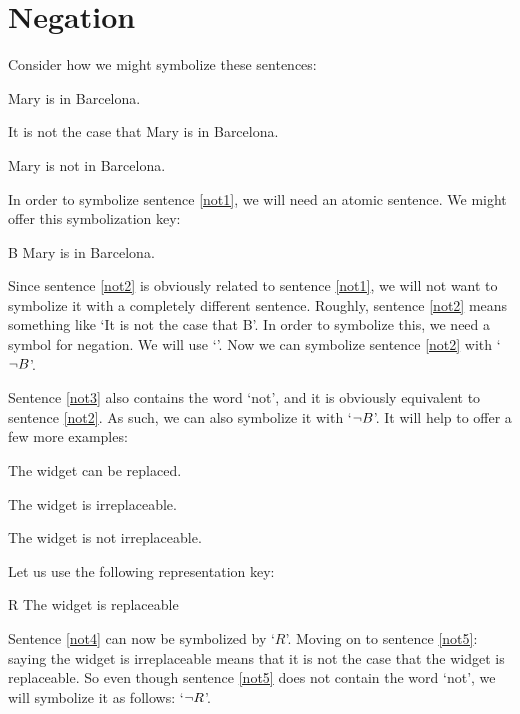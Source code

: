         
\section{Negation}

Consider how we might symbolize these sentences:
	\begin{earg}
	\item[\ex{not1}] Mary is in Barcelona.
	\item[\ex{not2}] It is not the case that Mary is in Barcelona.
	\item[\ex{not3}] Mary is not in Barcelona.
	\end{earg}
In order to symbolize sentence \ref{not1}, we will need an atomic sentence. We might offer this symbolization key:
	\begin{ekey}
		\item[B] Mary is in Barcelona.
	\end{ekey}
Since sentence \ref{not2} is obviously related to sentence \ref{not1}, we will not want to symbolize it with a completely different sentence. Roughly, sentence \ref{not2} means something like `It is not the case that B'. In order to symbolize this, we need a symbol for negation. We will use `\enot'. Now we can symbolize sentence \ref{not2} with `$\neg B$'.

Sentence \ref{not3} also contains the word `not', and it is obviously equivalent to sentence \ref{not2}. As such, we can also symbolize it with `$\neg B$'.
It will help to offer a few more examples:
	\begin{earg}
		\item[\ex{not4}] The widget can be replaced.
		\item[\ex{not5}] The widget is irreplaceable.
		\item[\ex{not5b}] The widget is not irreplaceable.
	\end{earg}
Let us use the following representation key:
	\begin{ekey}
		\item[R] The widget is replaceable
	\end{ekey}
Sentence \ref{not4} can now be symbolized by `$R$'. Moving on to sentence \ref{not5}: saying the widget is irreplaceable means that it is not the case that the widget is replaceable. So even though sentence \ref{not5} does not contain the word `not', we will symbolize it as follows: `$\neg R$'.

